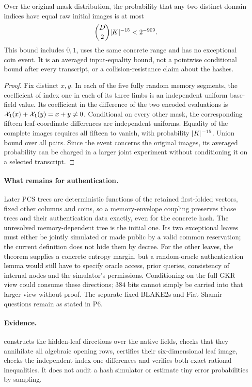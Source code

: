 \begin{corollary}\label{cor:zk-memory-leaf-collisions}
Over the original mask distribution, the probability that any two distinct domain indices have equal raw initial images is at most
\[
 \binom D2|K|^{-15}<2^{-909}.
\]
This bound includes $0,1$, uses the same concrete range and has no exceptional coin event. It is an averaged input-equality bound, not a pointwise conditional bound after every transcript, or a collision-resistance claim about the hashes.
\end{corollary}
\begin{proof}
Fix distinct $x,y$. In each of the five fully random memory segments, the coefficient of index one in each of its three limbs is an independent uniform base-field value. Its coefficient in the difference of the two encoded evaluations is $\mathcal{X}_1(x)+\mathcal{X}_1(y)=x+y\ne0$. Conditional on every other mask, the corresponding fifteen leaf-coordinate differences are independent uniforms. Equality of the complete images requires all fifteen to vanish, with probability $|K|^{-15}$. Union bound over all pairs. Since the event concerns the original images, its averaged probability can be charged in a larger joint experiment without conditioning it on a selected transcript.
\end{proof}

\paragraph{What remains for authentication.} Later PCS trees are deterministic functions of the retained first-folded vectors, fixed other columns and coins, so a memory-envelope coupling preserves those trees and their authentication data exactly, even for the concrete hash. The unresolved memory-dependent tree is the initial one. Its two exceptional leaves must either be jointly simulated or made public by a valid common reservation; the current definition does not hide them by decree. For the other leaves, the theorem supplies a concrete entropy margin, but a random-oracle authentication lemma would still have to specify oracle access, prior queries, consistency of internal nodes and the simulator's permissions. Conditioning on the full GKR view could consume these directions; $384$ bits cannot simply be carried into that larger view without proof. The separate fixed-BLAKE2s and Fiat-Shamir questions remain as stated in P6.

\paragraph{Evidence.}  constructs the hidden-leaf directions over the native fields, checks that they annihilate all algebraic opening rows, certifies their six-dimensional leaf image, checks the independent index-one differences and verifies both exact rational inequalities. It does not audit a hash simulator or estimate tiny error probabilities by sampling.
